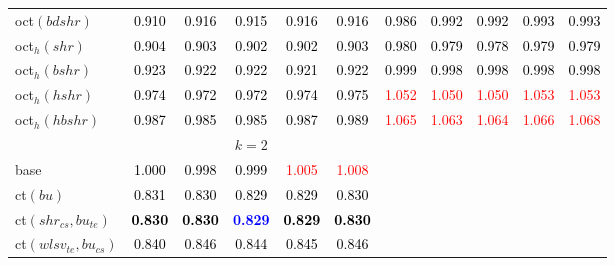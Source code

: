 \begin{tabular}[t]{l|>{}cccc>{}c|ccccc}
oct$(bdshr)$ & \textcolor{black}{0.910} & \textcolor{black}{0.916} & \textcolor{black}{0.915} & \textcolor{black}{0.916} & \textcolor{black}{0.916} & \textcolor{black}{0.986} & \textcolor{black}{0.992} & \textcolor{black}{0.992} & \textcolor{black}{0.993} & \textcolor{black}{0.993}\\
oct$_h(shr)$ & \textcolor{black}{0.904} & \textcolor{black}{0.903} & \textcolor{black}{0.902} & \textcolor{black}{0.902} & \textcolor{black}{0.903} & \textcolor{black}{0.980} & \textcolor{black}{0.979} & \textcolor{black}{0.978} & \textcolor{black}{0.979} & \textcolor{black}{0.979}\\
oct$_h(bshr)$ & \textcolor{black}{0.923} & \textcolor{black}{0.922} & \textcolor{black}{0.922} & \textcolor{black}{0.921} & \textcolor{black}{0.922} & \textcolor{black}{0.999} & \textcolor{black}{0.998} & \textcolor{black}{0.998} & \textcolor{black}{0.998} & \textcolor{black}{0.998}\\
oct$_h(hshr)$ & \textcolor{black}{0.974} & \textcolor{black}{0.972} & \textcolor{black}{0.972} & \textcolor{black}{0.974} & \textcolor{black}{0.975} & \textcolor{red}{1.052} & \textcolor{red}{1.050} & \textcolor{red}{1.050} & \textcolor{red}{1.053} & \textcolor{red}{1.053}\\
oct$_h(hbshr)$ & \textcolor{black}{0.987} & \textcolor{black}{0.985} & \textcolor{black}{0.985} & \textcolor{black}{0.987} & \textcolor{black}{0.989} & \textcolor{red}{1.065} & \textcolor{red}{1.063} & \textcolor{red}{1.064} & \textcolor{red}{1.066} & \textcolor{red}{1.068}\\
\addlinespace[0.3em]
\multicolumn{1}{c}{} & \multicolumn{5}{c}{\textbf{$k = 2$}} & \multicolumn{5}{c}{}\\
base & \textcolor{black}{1.000} & \textcolor{black}{0.998} & \textcolor{black}{0.999} & \textcolor{red}{1.005} & \textcolor{red}{1.008} &  &  &  &  & \\
ct$(bu)$ & \textcolor{black}{0.831} & \textcolor{black}{0.830} & \textcolor{black}{0.829} & \textcolor{black}{0.829} & \textcolor{black}{0.830} &  &  &  &  & \\
ct$(shr_{cs}, bu_{te})$ & \textcolor{black}{\textbf{0.830}} & \textcolor{black}{\textbf{0.830}} & \textcolor{blue}{\textbf{0.829}} & \textcolor{black}{\textbf{0.829}} & \textcolor{black}{\textbf{0.830}} &  &  &  &  & \\
ct$(wlsv_{te}, bu_{cs})$ & \textcolor{black}{0.840} & \textcolor{black}{0.846} & \textcolor{black}{0.844} & \textcolor{black}{0.845} & \textcolor{black}{0.846} &  &  &  &  & \\

\end{tabular}
